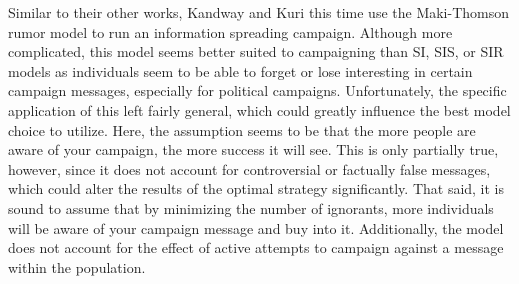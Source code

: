 Similar to their other works, Kandway and Kuri this time use the Maki-Thomson rumor model to run an information spreading campaign. Although more complicated, this model seems better suited to campaigning than SI, SIS, or SIR models as individuals seem to be able to forget or lose interesting in certain campaign messages, especially for political campaigns. Unfortunately, the specific application of this left fairly general, which could greatly influence the best model choice to utilize. Here, the assumption seems to be that the more people are aware of your campaign, the more success it will see. This is only partially true, however, since it does not account for controversial or factually false messages, which could alter the results of the optimal strategy significantly. That said, it is sound to assume that by minimizing the number of ignorants, more individuals will be aware of your campaign message and buy into it. Additionally, the model does not account for the effect of active attempts to campaign against a message within the population.